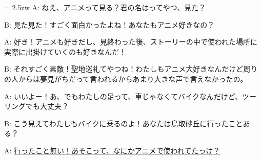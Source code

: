 \documentclass[11pt]{amsart}
\title{}
\author{}
\newenvironment{hangall}[1]{\hangindent = 2.5zw\everypar{\hangindent = 2.5zw}}{}
\begin{document}
\maketitle
\begin{hangall}{}%
A: ねえ、アニメって見る？君の名はってやつ、見た？

B: 見た見た！すごく面白かったよね！あなたもアニメ好きなの？

A: 好き！アニメも好きだし、見終わった後、ストーリーの中で使われた場所に実際に出掛けていくのも好きなんだ！

B: それすごく素敵！聖地巡礼てやつね！わたしもアニメ大好きなんだけど周りの人からは夢見がちだって言われるからあまり大きな声で言えなかったの。

A: いいよー！あ、でもわたしの足って、車じゃなくてバイクなんだけど、ツーリングでも大丈夫？

B: こう見えてわたしもバイクに乗るのよ！あなたは鳥取砂丘に行ったことある？

A: \ul{行ったこと無い！あそこって、なにかアニメで使われてたっけ？}\end{hangall}
\end{document}
